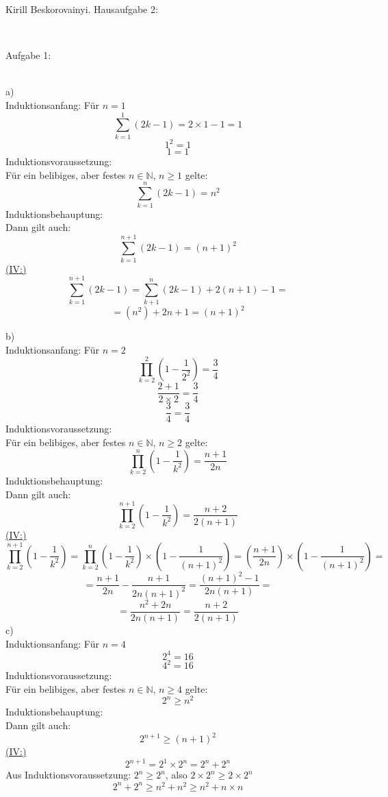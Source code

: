 \documentclass[11pt]{article}
\begin{document}
	\noindent \begin{huge}Kirill Beskorovainyi. Hausaufgabe 2:\end{huge}\\\vspace{0.05in}

		\noindent \begin{Large}Aufgabe 1:\end{Large}\\[2pt]
			\indent a)\\
				Induktionsanfang: Für $n=1$
					$$\sum\limits_{k=1}^1 (2k-1)=2 \times 1 - 1 = 1$$
					$$1^2=1$$
					$$1 = 1$$
				Induktionsvoraussetzung:\\
				Für ein belibiges, aber festes $n \in \mathbb{N}$, $n \geq 1$ gelte:
					$$\sum\limits_{k=1}^n(2k-1)=n^2$$
				Induktionsbehauptung:\\
				Dann gilt auch:
				$$\sum \limits_{k=1}^{n+1}(2k-1)=(n+1)^2$$
				\underline{(IV:)} \\
					$$\sum\limits_{k=1}^{n+1}(2k-1)=\sum\limits_{k+1}^{n}(2k-1)+2(n+1)-1=$$
					$$=(n^2)+2n+1 = (n+1)^2$$

			\indent b)\\
				Induktionsanfang: Für $n=2$
					$$\prod\limits_{k=2}^2(1-\frac{1}{2^2})=\frac{3}{4}$$
					$$\frac{2+1}{2\times2}=\frac{3}{4}$$
					$$\frac{3}{4}=\frac{3}{4}$$
				Induktionsvoraussetzung:\\
				Für ein belibiges, aber festes $n \in \mathbb{N}$, $n \geq 2$ gelte:
					$$\prod\limits_{k=2}^n(1-\frac{1}{k^2})=\frac{n+1}{2n}$$
				Induktionsbehauptung:\\
				Dann gilt auch:
					$$\prod\limits_{k=2}^{n+1}(1-\frac{1}{k^2})=\frac{n+2}{2(n+1)}$$
				\underline{(IV:)} \\
					$$\prod\limits_{k=2}^{n+1}(1-\frac{1}{k^2})=\prod\limits_{k=2}^n(1-\frac{1}{k^2})\times(1-\frac{1}{(n+1)^2})=\left(\frac{n+1}{2n}\right)\times\left(1-\frac{1}{(n+1)^2}\right)=$$
					$$=\frac{n+1}{2n}-\frac{n+1}{2n(n+1)^2}=\frac{(n+1)^2-1}{2n(n+1)}=$$
					$$=\frac{n^2+2n}{2n(n+1)}=\frac{n+2}{2(n+1)}$$
			\indent c)\\
				Induktionsanfang: Für $n=4$
					$$2^4 = 16$$
					$$4^2 = 16$$
				Induktionsvoraussetzung:\\
				Für ein belibiges, aber festes $n \in \mathbb{N}$, $n \geq 4$ gelte:
					$$2^n \geq n^2$$
				Induktionsbehauptung:\\
				Dann gilt auch:
					$$2^{n+1}\geq (n+1)^2$$
				\underline{(IV:)} \\
					$$2^{n+1}=2^1 \times 2^n=2^n+2^n$$
					Aus Induktionsvoraussetzung: $2^n \geq 2^n$, also $2 \times 2^n \geq 2 \times 2^n$
					$$2^n+2^n \geq n^2+n^2 \geq n^2+n \times n$$
					
\end{document}
